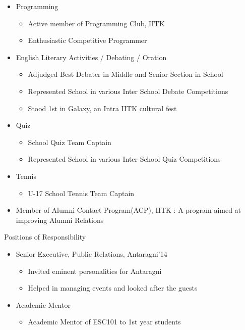 \documentclass{article}
\begin{document}
\begin{itemize}
\item Programming
	\begin{itemize}
	\item Active member of Programming Club, IITK
	\item Enthusiastic Competitive Programmer
	\end{itemize}
\item English Literary Activities / Debating / Oration
	\begin{itemize}
	\item Adjudged Best Debater in Middle and Senior Section in School
	\item Represented School in various Inter School Debate Competitions
	\item Stood 1st in Galaxy, an Intra IITK cultural fest 
	\end{itemize}
\item Quiz
	\begin{itemize}
	\item School Quiz Team Captain
	\item Represented School in various Inter School Quiz Competitions
	\end{itemize}
\item Tennis
	\begin{itemize}
	\item U-17 School Tennis Team Captain
	\end{itemize}
\item Member of Alumni Contact Program(ACP), IITK : A program aimed at improving Alumni Relations
\end{itemize}
\vspace{10pt}
{\Large Positions of Responsibility}
\begin{itemize}
\item Senior Executive, Public Relations, Antaragni’14
	\begin{itemize}
	\item Invited eminent personalities for Antaragni
	\item Helped in managing events and looked after the guests
	\end{itemize}
\item Academic Mentor
\begin{itemize}
\item Academic Mentor of ESC101 to 1st year students
\end{itemize}
\end{itemize}
\end{document}
